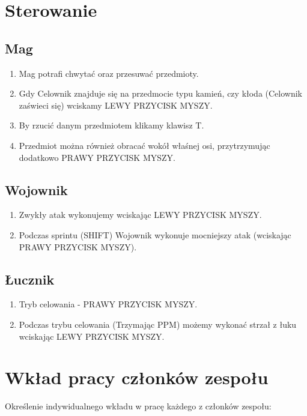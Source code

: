 \documentclass[openright]{xmgr}
\begin{document}
\chapter*{Sterowanie}
\section*{Mag}
\begin{enumerate}
\item{Mag potrafi chwytać oraz przesuwać przedmioty.}
\item{Gdy Celownik znajduje się na przedmocie typu kamień, }czy kłoda (Celownik zaświeci się) wciskamy LEWY PRZYCISK MYSZY.
\item{By rzucić danym przedmiotem klikamy klawisz T.}
\item{Przedmiot można również obracać wokół właśnej osi, przytrzymując dodatkowo PRAWY PRZYCISK MYSZY.}
\end{enumerate}

\section*{Wojownik}
\begin{enumerate}
\item{Zwykły atak wykonujemy wciskając LEWY PRZYCISK MYSZY.}
\item{Podczas sprintu (SHIFT) Wojownik wykonuje mocniejszy atak (wciskając PRAWY PRZYCISK MYSZY).}
\end{enumerate}

\section*{Łucznik}
\begin{enumerate}
\item{Tryb celowania - PRAWY PRZYCISK MYSZY.}
\item{Podczas trybu celowania (Trzymając PPM) możemy wykonać strzał z łuku wciskając LEWY PRZYCISK MYSZY.}
\end{enumerate}

\chapter*{Wkład pracy członków zespołu}

Określenie indywidualnego wkładu w pracę każdego z członków zespołu:
\end{document}
